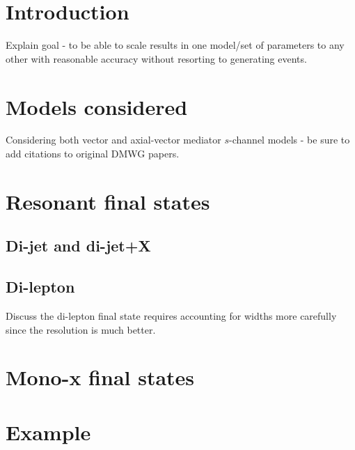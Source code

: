 \documentclass[a4paper, 11pt,notoc]{article}
\begin{document}
\newpage 


\section{Introduction}
\label{sec:introduction}

Explain goal - to be able to scale results in one model/set of parameters to any other with reasonable accuracy without resorting to generating events.


\section{Models considered}
\label{sec:models}

Considering both vector and axial-vector mediator $s$-channel models - be sure to add citations to original DMWG papers.


\section{Resonant final states}


\subsection{Di-jet and di-jet+X}

\subsection{Di-lepton}

Discuss the di-lepton final state requires accounting for widths more carefully since the resolution is much better.


\section{Mono-x final states}



\section{Example}
\end{document}
